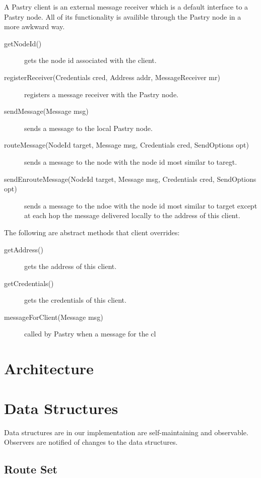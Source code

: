 \documentclass{article}
\begin{document}
A Pastry client is an external message receiver which is a default
interface to a Pastry node.  All of its functionality is availible
through the Pastry node in a more awkward way.

\begin{description}

\item [getNodeId()] gets the node id associated with the client.
\item [registerReceiver(Credentials cred, Address addr,
  MessageReceiver mr)] registers a message receiver with the Pastry
  node.
\item [sendMessage(Message msg)] sends a message to the local Pastry
  node.
\item [routeMessage(NodeId target, Message msg, Credentials cred,
  SendOptions opt)] sends a message to the node with the node id
  most similar to taregt.
\item [sendEnrouteMessage(NodeId target, Message msg, Credentials cred,
  SendOptions opt)] sends a message to the ndoe with the node id
  most similar to target except at each hop the message delivered
  locally to the address of this client.
\end{description}

The following are abstract methods that client overrides:

\begin{description}

\item [getAddress()] gets the address of this client.
\item [getCredentials()] gets the credentials of this client.
\item [messageForClient(Message msg)] called by Pastry when a message
  for the cl

\end{description}

\section{Architecture}

\section{Data Structures}\label{section:ds}
Data structures are in our implementation are self-maintaining and
observable.  Observers are notified of changes to the data structures.

\subsection{Route Set}
\end{document}
